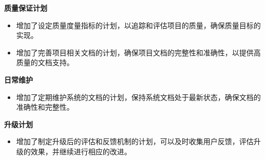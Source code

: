 \documentclass{article}
\begin{document}
\textbf{质量保证计划}
\begin{itemize}
	\item 增加了设定质量度量指标的计划，以追踪和评估项目的质量，确保质量目标的实现。
	\item 增加了完善项目相关文档的计划，确保项目文档的完整性和准确性，以提供高质量的文档支持。
\end{itemize}

\textbf{日常维护}
\begin{itemize}
	\item 增加了定期维护系统的文档的计划，保持系统文档处于最新状态，确保文档的准确性和完整性。
\end{itemize}

\textbf{升级计划}
\begin{itemize}
	\item 增加了制定升级后的评估和反馈机制的计划，可以及时收集用户反馈，评估升级的效果，并继续进行相应的改进。
\end{itemize}
\end{document}
